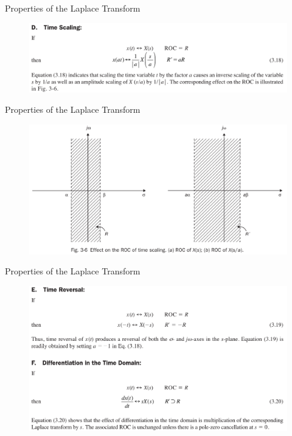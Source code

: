 \documentclass[pdflatex,compress,mathserif]{beamer}
\begin{document}
\begin{frame}{Properties of the Laplace Transform}
	\begin{figure}
		\centering
		\includegraphics[width=\linewidth]{img/img22}
	\end{figure}
\end{frame}

\begin{frame}{Properties of the Laplace Transform}
	\begin{figure}
		\centering
		\includegraphics[width=\linewidth]{img/img23}
	\end{figure}
\end{frame}

\begin{frame}{Properties of the Laplace Transform}
	\begin{figure}
		\centering
		\includegraphics[width=\linewidth]{img/img24}
	\end{figure}
\end{frame}
\end{document}
